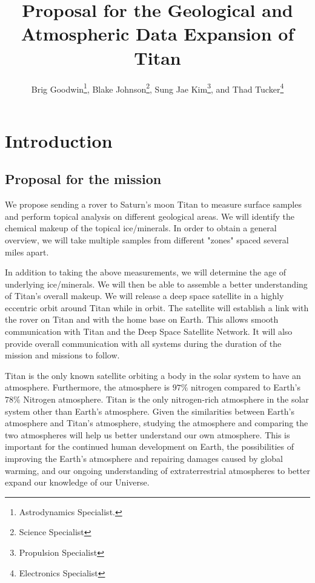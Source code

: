 \documentclass[conf]{new-aiaa}
\title{Proposal for the Geological and Atmospheric Data Expansion of Titan}
\author{Brig Goodwin\footnote{Astrodynamics Specialist.}, Blake Johnson\footnote{Science Specialist}, Sung Jae Kim\footnote{Propulsion Specialist}, and Thad Tucker\footnote{Electronics Specialist}}
\affil{College of Engineering, University of Oklahoma, Norman, Ok, 73019}
\begin{document}
\maketitle

\section{Introduction}
\subsection{Proposal for the mission}
We propose sending a rover to Saturn's moon Titan to measure surface samples and perform topical analysis on different geological areas. We will identify the chemical makeup of the topical ice/minerals.  In order to obtain a general overview, we will take multiple samples from different "zones" spaced several miles apart.\\
\par In addition to taking the above measurements, we will determine the age of underlying ice/minerals. We will then be able to assemble a better understanding of Titan's overall makeup. We will release a deep space satellite in a highly eccentric orbit around Titan while in orbit. The satellite will establish a link with the rover on Titan and with the home base on Earth. This allows smooth communication with Titan and the Deep Space Satellite Network. It will also provide overall communication with all systems during the duration of the mission and missions to follow.\\
\par Titan is the only known satellite orbiting a body in the solar system to have an atmosphere. Furthermore, the atmosphere is $97\%$ nitrogen compared to Earth's $78\%$ Nitrogen atmosphere\cite{NASA}. Titan is the only nitrogen-rich atmosphere in the solar system other than Earth's atmosphere. Given the similarities between Earth's atmosphere and Titan's atmosphere, studying the atmosphere and comparing the two atmospheres will help us better understand our own atmosphere.  This is important for the continued human development on Earth, the possibilities of improving the Earth's atmosphere and repairing damages caused by global warming, and our ongoing understanding of extraterrestrial atmospheres to better expand our knowledge of our Universe.
\end{document}
